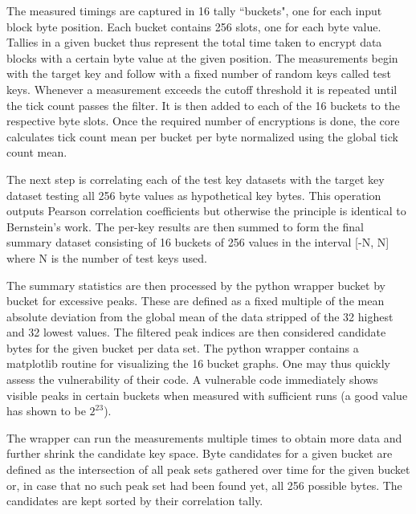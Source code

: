 \documentclass{article}
\begin{document}
The measured timings are captured in 16 tally ``buckets", one for each input block byte position. Each bucket contains 256 slots, one for each byte value.
Tallies in a given bucket thus represent the total time taken to encrypt data blocks with a certain byte value at the given position.
The measurements begin with the target key and follow with a fixed number of random keys called test keys.
Whenever a measurement exceeds the cutoff threshold it is repeated until the tick count passes the filter. It is then added to each of the 16 buckets to the respective byte slots.
Once the required number of encryptions is done, the core calculates tick count mean per bucket per byte normalized using the global tick count mean.

The next step is correlating each of the test key datasets with the target key dataset testing all 256 byte values as hypothetical key bytes.
This operation outputs Pearson correlation coefficients but otherwise the principle is identical to Bernstein's work.
The per-key results are then summed to form the final summary dataset consisting of 16 buckets of 256 values in the interval [-N, N] where N is the number of test keys used.

The summary statistics are then processed by the python wrapper bucket by bucket for excessive peaks.
These are defined as a fixed multiple of the mean absolute deviation from the global mean of the data stripped of the 32 highest and 32 lowest values.
The filtered peak indices are then considered candidate bytes for the given bucket per data set. The python wrapper contains a matplotlib routine for visualizing the 16 bucket graphs.
One may thus quickly assess the vulnerability of their code. A vulnerable code immediately shows visible peaks in certain buckets when measured with sufficient runs (a good value has shown to be $2^{23}$).

The wrapper can run the measurements multiple times to obtain more data and further shrink the candidate key space.
Byte candidates for a given bucket are defined as the intersection of all peak sets gathered over time for the given bucket or, in case that no such peak set had been found yet, all 256 possible bytes.
The candidates are kept sorted by their correlation tally.
\end{document}
